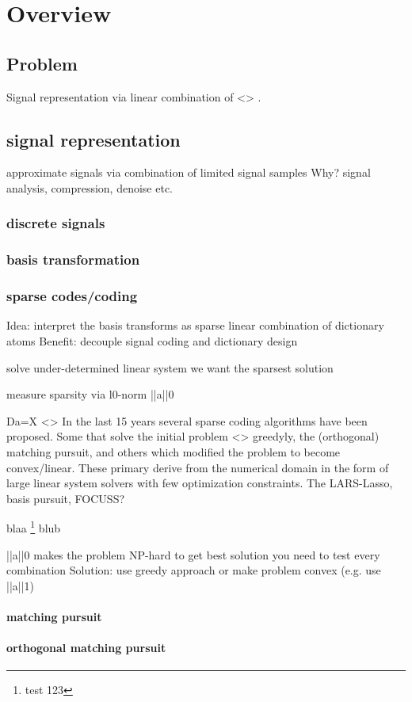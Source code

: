 \chapter{Overview}

\section{Problem}
Signal representation via linear combination of <> .
\section{signal representation}
approximate signals via combination of limited signal samples
Why?
signal analysis, compression, denoise etc.
\subsection{discrete signals}
\subsection{basis transformation}
\subsection{sparse codes/coding}
Idea: interpret the basis transforms as sparse linear combination of dictionary atoms
Benefit: decouple signal coding and dictionary design


solve under-determined linear system
we want the sparsest solution

measure sparsity via       l0-norm       ||a||0


Da=X
<>
In the last 15 years several sparse coding algorithms have been proposed. Some that solve the initial problem <> greedyly, the (orthogonal) matching pursuit, and others which modified the problem to become convex/linear. These primary derive from the numerical domain in the form of 
large linear system solvers with few optimization constraints. The LARS-Lasso, basis pursuit, FOCUSS?


blaa \footnote{test 123} blub

||a||0 makes the problem NP-hard
to get best solution you need to test every combination
Solution:
use greedy approach or 									make problem convex (e.g. use ||a||1)
\subsubsection{matching pursuit}
\subsubsection{orthogonal matching pursuit}
\label{sec:omp}
